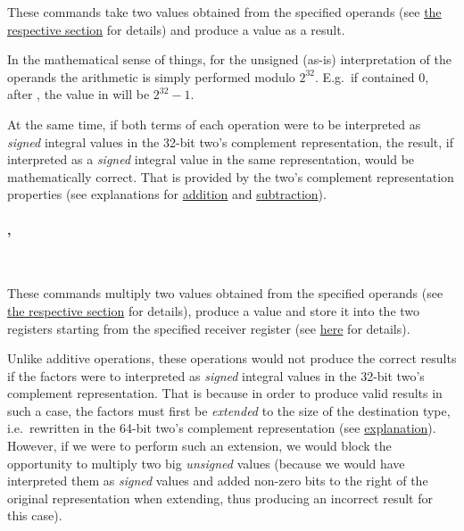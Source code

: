 These commands take two  values obtained from the specified operands
(see \hyperlink{types:twos_complement}{the respective section} for details)
and produce a  value as a result.

In the mathematical sense of things, for the unsigned (as-is) interpretation of
the operands the arithmetic is simply performed modulo $2^{32}$.
E.g.\ if  contained 0, after ,
the value in  will be $2^{32}-1$.

At the same time, if both terms of each operation were to be interpreted as
\textit{signed} integral values in the 32-bit two's complement representation,
the result, if interpreted as a \textit{signed} integral value in the same
representation, would be mathematically correct.
That is provided by the two's complement representation properties
(see explanations for
\href{https://en.wikipedia.org/wiki/Two\%27s_complement#Addition}{addition} and
\href{https://en.wikipedia.org/wiki/Two\%27s_complement#Subtraction}
{subtraction}).

\vspace{-0.35cm}
\paragraph{, }\

These commands multiply two  values obtained from the specified
operands (see \hyperlink{types:twos_complement}{the respective section}
for details), produce a  value and store it into the two registers
starting from the specified receiver register
(see \hyperlink{types:two_words_storage}{here} for details).

Unlike additive operations, these operations would not produce the correct
results if the factors were to interpreted as \textit{signed} integral values
in the 32-bit two's complement representation.
That is because in order to produce valid results in such a case,
the factors must first be \textit{extended} to the size of the destination type,
i.e.\ rewritten in the 64-bit two's complement representation (see
\href{https://en.wikipedia.org/wiki/Two\%27s_complement#Multiplication}
{explanation}).
However, if we were to perform such an extension, we would block the opportunity
to multiply two big \textit{unsigned} values (because we would have interpreted
them as \textit{signed} values and added non-zero bits to the right of
the original representation when extending, thus producing an incorrect result
for this case).

